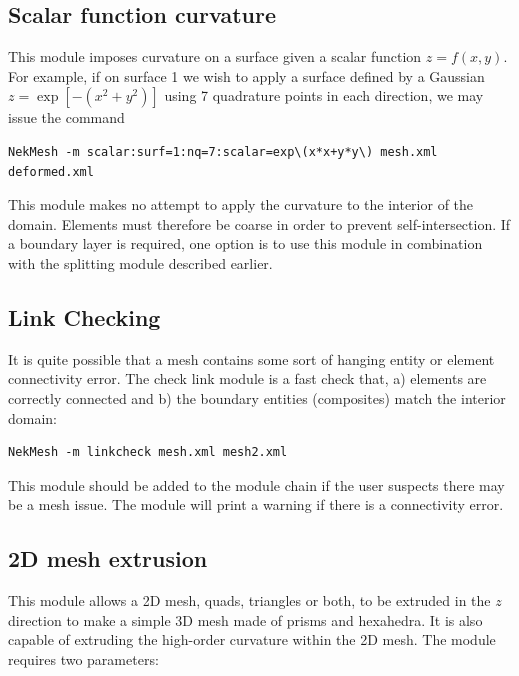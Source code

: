 \subsection{Scalar function curvature}

This module imposes curvature on a surface given a scalar function
$z=f(x,y)$. For example, if on surface 1 we wish to apply a surface defined by a
Gaussian $z = \exp[-(x^2+y^2)]$ using 7 quadrature points in each direction, we
may issue the command

\begin{lstlisting}[style=BashInputStyle]
  NekMesh -m scalar:surf=1:nq=7:scalar=exp\(x*x+y*y\) mesh.xml deformed.xml
\end{lstlisting}

\begin{notebox}
  This module makes no attempt to apply the curvature to the interior of the
  domain. Elements must therefore be coarse in order to prevent
  self-intersection. If a boundary layer is required, one option is to use this
  module in combination with the splitting module described earlier.
\end{notebox}

\subsection{Link Checking}

It is quite possible that a mesh contains some sort of hanging entity or
element connectivity error. The check link module is a fast check that, a)
elements are correctly connected and b) the boundary entities (composites)
match the interior domain:

\begin{lstlisting}[style=BashInputStyle]
  NekMesh -m linkcheck mesh.xml mesh2.xml
\end{lstlisting}

This module should be added to the module chain if the user suspects there may
be a mesh issue. The module will print a warning if there is a connectivity
error.

\subsection{2D mesh extrusion}

This module allows a 2D mesh, quads, triangles or both, to be extruded in the
$z$ direction to make a simple 3D mesh made of prisms and hexahedra. It is also
capable of extruding the high-order curvature within the 2D mesh. The module
requires two parameters:

